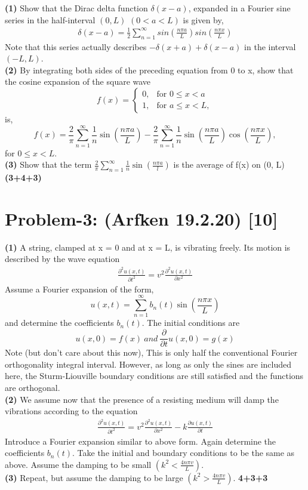 \documentclass[12pt, a4paper]{article}
\begin{document}
\textbf{(1)} Show that the Dirac delta function $\delta(x-a)$, expanded in a Fourier sine series in
the half-interval $(0, L)$ $(0 < a < L)$ is given by,
\begin{align*}
    \delta(x-a) = \frac{1}{2} \sum_{n=1}^{\infty} sin(\frac{n\pi a}{L})sin(\frac{n\pi x}{L})
\end{align*}
Note that this series actually describes $-\delta(x + a) + \delta(x-a)$ in the interval
$(-L , L)$.\\
\textbf{(2)} By integrating both sides of the preceding equation from 0 to x, show that the
cosine expansion of the square wave
\[ f(x) =
\begin{cases} 
0, & \text{for } 0 \leq x < a \\
1, & \text{for } a \leq x < L,
\end{cases}
\] 
is,
\[
f(x) = \frac{2}{\pi} \sum_{n=1}^{\infty} \frac{1}{n} \sin\left(\frac{n\pi a}{L}\right) 
- \frac{2}{\pi} \sum_{n=1}^{\infty} \frac{1}{n} \sin\left(\frac{n\pi a}{L}\right) 
\cos\left(\frac{n\pi x}{L}\right),
\]
for $0 \leq x < L$.\\
\textbf{(3)} Show that the term $\frac{2}{\pi}\sum_{n=1}^{\infty}\frac{1}{n}\sin(\frac{n\pi a}{l})$ 
is the average of f(x) on (0, L)
\hfill\textbf{(3+4+3)}

\section*{Problem-3: (Arfken 19.2.20) \hfill \textbf{[10]}}
\textbf{(1)} A string, clamped at x = 0 and at x = L, is vibrating freely. Its motion is described 
by the wave equation
\begin{align*}
    \frac{\partial^2 u(x,t)}{\partial t^2} = v^2 \frac{\partial^2 u(x,t)}{\partial x^2}
\end{align*}
Assume a Fourier expansion of the form,
\[
u(x, t) = \sum_{n=1}^{\infty} b_n(t) \sin\left(\frac{n\pi x}{L}\right)
\]
and determine the coefficients $b_n(t)$. The initial conditions are
\[
u(x, 0) = f(x)\ and\ \frac{\partial }{\partial t}u(x, 0) = g(x)
\]
Note (but don't care about this now), This is only half the conventional Fourier orthogonality integral interval. However, as long 
as only the sines are included here, the Sturm-Liouville boundary conditions are still satisfied 
and the functions are orthogonal.\\
\textbf{(2)} We assume now that the presence of a resisting medium will damp the vibrations 
according to the equation
\begin{align*}
    \frac{\partial^2 u(x,t)}{\partial t^2} = v^2 \frac{\partial^2 u(x,t)}{\partial x^2} - k \frac{\partial u(x,t)}{\partial t}
\end{align*}
Introduce a Fourier expansion similar to above form.
Again determine the coefficients $b_n(t)$. Take the initial and boundary conditions to be the same 
as above. Assume the damping to be small $(k^2 < \frac{4n\pi v}{L})$.\\
\textbf{(3)} Repeat, but assume the damping to be large $(k^2 > \frac{4n\pi v}{L})$. \hfill\textbf{4+3+3}
\end{document}
